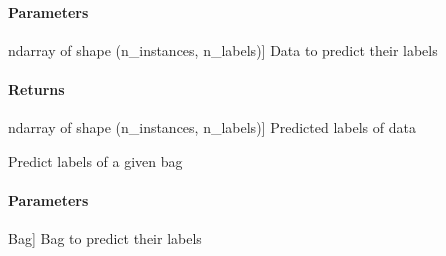 \documentclass[letterpaper,10pt,english]{sphinxmanual}
\begin{document}
\begin{fulllineitems}
\begin{fulllineitems}
\paragraph{Parameters}
\label{\detokenize{classifier/mimlTOml/_autosummary/miml.classifier.mimlTOml.miml_to_ml_classifier.MIMLtoMLClassifier:id3}}\begin{description}
\sphinxlineitem{x}{[}ndarray of shape (n\_instances, n\_labels){]}
\sphinxAtStartPar
Data to predict their labels

\end{description}


\paragraph{Returns}
\label{\detokenize{classifier/mimlTOml/_autosummary/miml.classifier.mimlTOml.miml_to_ml_classifier.MIMLtoMLClassifier:id4}}\begin{description}
\sphinxlineitem{results}{[}ndarray of shape (n\_instances, n\_labels){]}
\sphinxAtStartPar
Predicted labels of data

\end{description}

\end{fulllineitems}


\begin{fulllineitems}
\label{\detokenize{classifier/mimlTOml/_autosummary/miml.classifier.mimlTOml.miml_to_ml_classifier.MIMLtoMLClassifier:miml.classifier.mimlTOml.miml_to_ml_classifier.MIMLtoMLClassifier.predict_bag}}
\pysigstartsignatures
{}
\pysigstopsignatures
\sphinxAtStartPar
Predict labels of a given bag


\paragraph{Parameters}
\label{\detokenize{classifier/mimlTOml/_autosummary/miml.classifier.mimlTOml.miml_to_ml_classifier.MIMLtoMLClassifier:id5}}\begin{description}
\sphinxlineitem{bag}{[}Bag{]}
\sphinxAtStartPar
Bag to predict their labels


\end{description}
\end{fulllineitems}
\end{fulllineitems}
\end{document}
